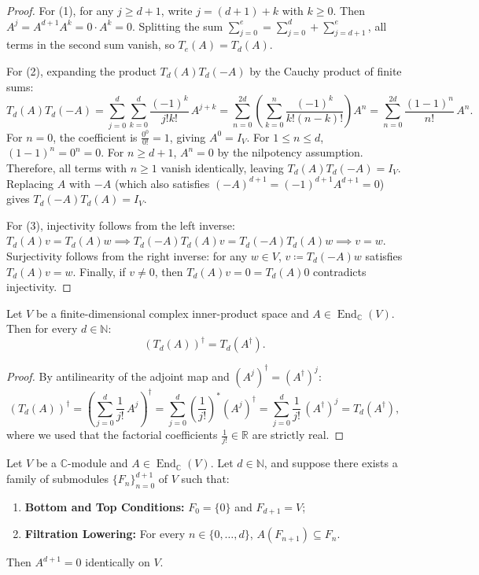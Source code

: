 \begin{proof}
For (1), for any $j \ge d + 1$, write $j = (d + 1) + k$ with $k \ge 0$. Then $A^j = A^{d+1} A^k = 0 \cdot A^k = 0$.
Splitting the sum $\sum_{j=0}^e = \sum_{j=0}^d + \sum_{j=d+1}^e$, all terms in the second sum vanish, so $T_e(A) = T_d(A)$.

For (2), expanding the product $T_d(A) T_d(-A)$ by the Cauchy product of finite sums:
\[
T_d(A) T_d(-A) = \sum_{j=0}^d \sum_{k=0}^d \frac{(-1)^k}{j! k!}\, A^{j+k} = \sum_{n=0}^{2d} \left( \sum_{k=0}^n \frac{(-1)^k}{k! (n-k)!} \right) A^n = \sum_{n=0}^{2d} \frac{(1 - 1)^n}{n!}\, A^n.
\]
For $n = 0$, the coefficient is $\frac{0^0}{0!} = 1$, giving $A^0 = I_V$.
For $1 \le n \le d$, $(1 - 1)^n = 0^n = 0$.
For $n \ge d + 1$, $A^n = 0$ by the nilpotency assumption.
Therefore, all terms with $n \ge 1$ vanish identically, leaving $T_d(A) T_d(-A) = I_V$.
Replacing $A$ with $-A$ (which also satisfies $(-A)^{d+1} = (-1)^{d+1} A^{d+1} = 0$) gives $T_d(-A) T_d(A) = I_V$.

For (3), injectivity follows from the left inverse: $T_d(A) v = T_d(A) w \implies T_d(-A) T_d(A) v = T_d(-A) T_d(A) w \implies v = w$.
Surjectivity follows from the right inverse: for any $w \in V$, $v \coloneqq T_d(-A) w$ satisfies $T_d(A) v = w$.
Finally, if $v \neq 0$, then $T_d(A) v = 0 = T_d(A) 0$ contradicts injectivity.
\end{proof}

\begin{proposition}
\label{prop:taylor_adjoint}
Let $V$ be a finite-dimensional complex inner-product space and $A \in \operatorname{End}_{\mathbb{C}}(V)$. Then for every $d \in \mathbb{N}$:
\begin{equation}
(T_d(A))^\dagger = T_d(A^\dagger).
\end{equation}
\end{proposition}

\begin{proof}
By antilinearity of the adjoint map and $(A^j)^\dagger = (A^\dagger)^j$:
\[
(T_d(A))^\dagger = \left( \sum_{j=0}^d \frac{1}{j!}\, A^j \right)^\dagger = \sum_{j=0}^d \left(\frac{1}{j!}\right)^* (A^j)^\dagger = \sum_{j=0}^d \frac{1}{j!}\, (A^\dagger)^j = T_d(A^\dagger),
\]
where we used that the factorial coefficients $\frac{1}{j!} \in \mathbb{R}$ are strictly real.
\end{proof}

\begin{theorem}
\label{thm:app_filtration_nilpotent}
Let $V$ be a $\mathbb{C}$-module and $A \in \operatorname{End}_{\mathbb{C}}(V)$. Let $d \in \mathbb{N}$, and suppose there exists a family of submodules $\{F_n\}_{n=0}^{d+1}$ of $V$ such that:
\begin{enumerate}
    \item \textbf{Bottom and Top Conditions:} $F_0 = \{0\}$ and $F_{d+1} = V$;
    \item \textbf{Filtration Lowering:} For every $n \in \{0, \dots, d\}$, $A(F_{n+1}) \subseteq F_n$.
\end{enumerate}
Then $A^{d+1} = 0$ identically on $V$.
\end{theorem}

